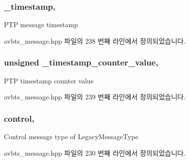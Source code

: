 \subsubsection[{\texorpdfstring{\+\_\+timestamp}{_timestamp}}]{ \+\_\+timestamp\hspace{0.3cm}{\ttfamily [protected]}, {\ttfamily [inherited]}}\hypertarget{class_p_t_p_message_common_aeafd115d5626f0602ab067a502d83d3e}{}\label{class_p_t_p_message_common_aeafd115d5626f0602ab067a502d83d3e}
P\+TP message timestamp 

avbts\+\_\+message.\+hpp 파일의 238 번째 라인에서 정의되었습니다.

\subsubsection[{\texorpdfstring{\+\_\+timestamp\+\_\+counter\+\_\+value}{_timestamp_counter_value}}]{\setlength{\rightskip}{0pt plus 5cm}unsigned \+\_\+timestamp\+\_\+counter\+\_\+value\hspace{0.3cm}{\ttfamily [protected]}, {\ttfamily [inherited]}}\hypertarget{class_p_t_p_message_common_a9d90ca571f84fe3633c7539e24783190}{}\label{class_p_t_p_message_common_a9d90ca571f84fe3633c7539e24783190}
P\+TP timestamp counter value 

avbts\+\_\+message.\+hpp 파일의 239 번째 라인에서 정의되었습니다.

\subsubsection[{\texorpdfstring{control}{control}}]{ control\hspace{0.3cm}{\ttfamily [protected]}, {\ttfamily [inherited]}}\hypertarget{class_p_t_p_message_common_a7de6f8422e6ca5ade1aeac73a44ec6f0}{}\label{class_p_t_p_message_common_a7de6f8422e6ca5ade1aeac73a44ec6f0}
Control message type of Legacy\+Message\+Type 

avbts\+\_\+message.\+hpp 파일의 230 번째 라인에서 정의되었습니다.

